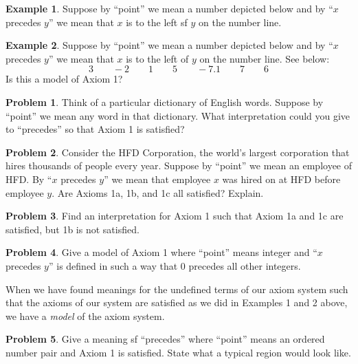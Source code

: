 \documentclass{article}
\theoremstyle{definition}
\theoremstyle{definition}
\newtheorem{example}{Example}
\newtheorem{problem}{Problem}
\theoremstyle{plain}
\begin{document}
\begin{example}
  Suppose by ``point'' we mean a number depicted below and by ``$x$ precedes
  $y$'' we mean that $x$ is to the left sf $y$ on the number line.
\end{example}

\begin{example}
  Suppose by ``point'' we mean a number depicted below and by ``$x$ precedes
  $y$'' we mean that $x$ is to the left of $y$ on the number line.  See below:
  \[3 \qquad -2 \qquad 1 \qquad 5 \qquad -7.1 \qquad 7 \qquad 6\]
  Is this a model of Axiom 1?
\end{example}

\begin{problem}
  Think of a particular dictionary of English words.  Suppose by ``point'' we
  mean any word in that dictionary.  What interpretation could you give to
  ``precedes'' so that Axiom 1 is satisfied?
\end{problem}

\begin{problem}
  Consider the HFD Corporation, the world's largest corporation that hires
  thousands of people every year.  Suppose by ``point'' we mean an employee of
  HFD.  By ``$x$ precedes $y$'' we mean that employee $x$ was hired on at HFD
  before employee $y$.  Are Axioms 1a, 1b, and 1c all satisfied? Explain.
\end{problem}

\begin{problem}
  Find an interpretation for Axiom 1 such that Axiom 1a and 1c are satisfied,
  but 1b is not satisfied.
\end{problem}

\begin{problem}
  Give a model of Axiom 1 where ``point'' means integer and ``$x$ precedes
  $y$'' is defined in such a way that 0 precedes all other integers.
\end{problem}

When we have found meanings for the undefined terms of our axiom system such
that the axioms of our system are satisfied as we did in Examples 1 and 2
above, we have a \emph{model} of the axiom system.

\begin{problem}
  Give a meaning sf ``precedes'' where ``point'' means an ordered number pair
  and Axiom 1 is satisfied.  State what a typical region would look like.
\end{problem}
\end{document}
